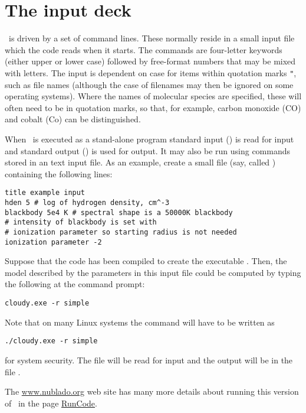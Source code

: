 \section{The input deck}

\noindent \Cloudy\ is driven by a set of command lines.
These normally reside in a small input file which the code reads
when it starts.
The commands are four-letter keywords (either
upper or lower case) followed by free-format numbers that
may be mixed with letters.  The input is dependent on case for items
within quotation marks \verb|"|, such as file names (although the
case of filenames may then be ignored on some operating
systems).  Where the names of 
molecular species are specified, these will often need to be in quotation
marks, so that, for example, carbon monoxide (CO) and cobalt (Co) can be
distinguished.

When \Cloudy\ is executed as a stand-alone program standard input
() is read for input and standard output
() is used for output.  It may also be run using
commands stored in an text input file.  As an example, create a small
file (say, called ) containing the following
lines:

\begin{verbatim}
title example input
hden 5 # log of hydrogen density, cm^-3
blackbody 5e4 K # spectral shape is a 50000K blackbody
# intensity of blackbody is set with
# ionization parameter so starting radius is not needed
ionization parameter -2
\end{verbatim}
Suppose that the code has been compiled to create the executable .
Then, the model described by the parameters in this input file could be
computed by typing the following at the command prompt:
\begin{verbatim}
cloudy.exe -r simple
\end{verbatim}
Note that on many Linux systems the command will have to be written as
\begin{verbatim}
./cloudy.exe -r simple
\end{verbatim}
for system security.  
The file  will be read for input and the output will be in the file
.  

The \href{http://www.nublado.org}{www.nublado.org} web site has many more details
about running this version of \Cloudy\ in the page
\href{https://gitlab.nublado.org/cloudy/cloudy/-/wikis/RunCode}{RunCode}.

